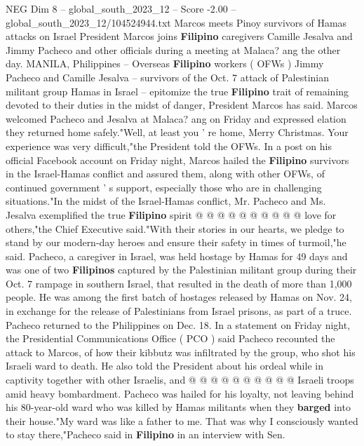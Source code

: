 \begin{textsample}{NEG Dim 8 – global\_south\_2023\_12 – Score -2.00 – global\_south\_2023\_12/104524944.txt}  \label{ex:f8_neg_009}
Marcos meets Pinoy survivors of Hamas attacks on Israel President Marcos joins \textbf{Filipino} caregivers Camille Jesalva and Jimmy Pacheco and other officials during a meeting at Malaca? ang the other day.
MANILA, Philippines -- Overseas \textbf{Filipino} workers ( OFWs ) Jimmy Pacheco and Camille Jesalva -- survivors of the Oct. 7 attack of Palestinian militant group Hamas in Israel -- epitomize the true \textbf{Filipino} trait of remaining devoted to their duties in the midst of danger, President Marcos has said.
Marcos welcomed Pacheco and Jesalva at Malaca? ang on Friday and expressed elation they returned home safely."Well, at least you ' re home, Merry Christmas.
Your experience was very difficult,"the President told the OFWs.
In a post on his official Facebook account on Friday night, Marcos hailed the \textbf{Filipino} survivors in the Israel-Hamas conflict and assured them, along with other OFWs, of continued government ' s support, especially those who are in challenging situations."In the midst of the Israel-Hamas conflict, Mr.
Pacheco and Ms.
Jesalva exemplified the true \textbf{Filipino} spirit @ @ @ @ @ @ @ @ @ @ love for others,"the Chief Executive said."With their stories in our hearts, we pledge to stand by our modern-day heroes and ensure their safety in times of turmoil,"he said.
Pacheco, a caregiver in Israel, was held hostage by Hamas for 49 days and was one of two \textbf{Filipinos} captured by the Palestinian militant group during their Oct. 7 rampage in southern Israel, that resulted in the death of more than 1,000 people.
He was among the first batch of hostages released by Hamas on Nov. 24, in exchange for the release of Palestinians from Israel prisons, as part of a truce.
Pacheco returned to the Philippines on Dec. 18.
In a statement on Friday night, the Presidential Communications Office ( PCO ) said Pacheco recounted the attack to Marcos, of how their kibbutz was infiltrated by the group, who shot his Israeli ward to death.
He also told the President about his ordeal while in captivity together with other Israelis, and @ @ @ @ @ @ @ @ @ @ Israeli troops amid heavy bombardment.
Pacheco was hailed for his loyalty, not leaving behind his 80-year-old ward who was killed by Hamas militants when they \textbf{barged} into their house."My ward was like a father to me.
That was why I consciously wanted to stay there,"Pacheco said in \textbf{Filipino} in an interview with Sen.

\end{textsample}
